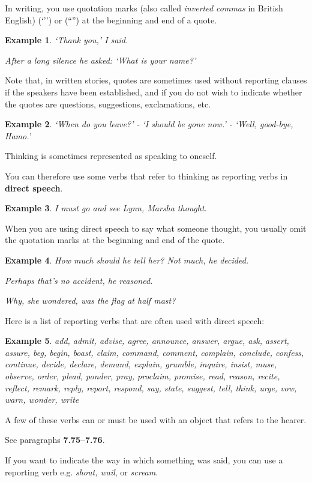 \documentclass[oneside]{book}
\numberwithin{equation}{section}
\newtheorem{example}{Example}[section]
\begin{document}
In writing, you use quotation marks (also called \textit{inverted commas} in British English) (`'') or (``'') at the beginning and end of a quote.
\begin{example}
    `Thank you,' I said.
    
    After a long silence he asked: `What is your name?'
\end{example}
Note that, in written stories, quotes are sometimes used without reporting clauses if the speakers have been established, and if you do not wish to indicate whether the quotes are questions, suggestions, exclamations, etc.
\begin{example}
    `When do you leave?' - `I should be gone now.' - `Well, good-bye, Hamo.'
\end{example}
%
\noindent{} Thinking is sometimes represented as speaking to oneself.

You can therefore use some verbs that refer to thinking as reporting verbs in \textbf{direct speech}.
\begin{example}
    I must go and see Lynn, Marsha thought.
\end{example}
When you are using direct speech to say what someone thought, you usually omit the quotation marks at the beginning and end of the quote.
\begin{example}
    How much should he tell her? Not much, he decided.
    
    Perhaps that's no accident, he reasoned.
    
    Why, she wondered, was the flag at half mast?
\end{example}
%
\noindent{} Here is a list of reporting verbs that are often used with direct speech:
\begin{example}
    add, admit, advise, agree, announce, answer, argue, ask, assert, assure, beg, begin, boast, claim, command, comment, complain, conclude, confess, continue, decide, declare, demand, explain, grumble, inquire, insist, muse, observe, order, plead, ponder, pray, proclaim, promise, read, reason, recite, reflect, remark, reply, report, respond, say, state, suggest, tell, think, urge, vow, warn, wonder, write
\end{example}
A few of these verbs can or must be used with an object that refers to the hearer.

See paragraphs \textbf{7.75--7.76}.

%
\noindent{} If you want to indicate the way in which something was said, you can use a reporting verb e.g. \textit{shout, wail}, or \textit{scream}.
\end{document}
